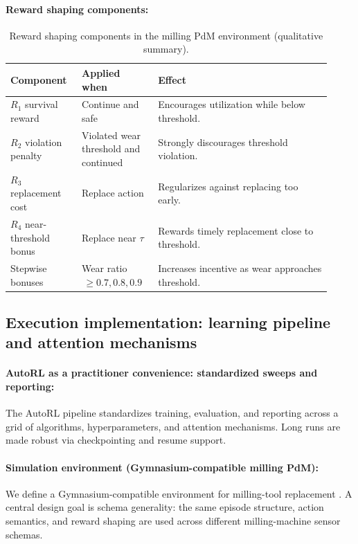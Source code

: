 \documentclass[sn-basic]{sn-jnl} %
\begin{document}
\paragraph{Reward shaping components:}
\begin{table}[htbp]
	\centering
	\caption{Reward shaping components in the milling PdM environment (qualitative summary).}
	\label{tab:reward_components}
	\begin{tabular}{L{0.20\linewidth} L{0.22\linewidth} L{0.50\linewidth}}
		\toprule
		\textbf{Component} & \textbf{Applied when} & \textbf{Effect}\\
		\midrule
		$R_1$ survival reward & Continue and safe & Encourages utilization while below threshold.\\
		$R_2$ violation penalty & Violated wear threshold and continued & Strongly discourages threshold violation.\\
		$R_3$ replacement cost & Replace action & Regularizes against replacing too early.\\
		$R_4$ near-threshold bonus & Replace near $\tau$ & Rewards timely replacement close to threshold.\\
		Stepwise bonuses & Wear ratio $\,\ge 0.7, 0.8, 0.9$ & Increases incentive as wear approaches threshold.\\
		\bottomrule
	\end{tabular}
\end{table}

\subsection{Execution implementation: learning pipeline and attention mechanisms}\label{sec:algo_desc}
\paragraph{AutoRL as a practitioner convenience: standardized sweeps and reporting:}\label{sec:autorl}
The AutoRL pipeline standardizes training, evaluation, and reporting across a grid of algorithms, hyperparameters, and attention mechanisms. Long runs are made robust via checkpointing and resume support.

\paragraph{Simulation environment (Gymnasium-compatible milling PdM):}
We define a Gymnasium-compatible environment for milling-tool replacement \cite{Foundation2023}. A central design goal is schema generality: the same episode structure, action semantics, and reward shaping are used across different milling-machine sensor schemas.
\end{document}
